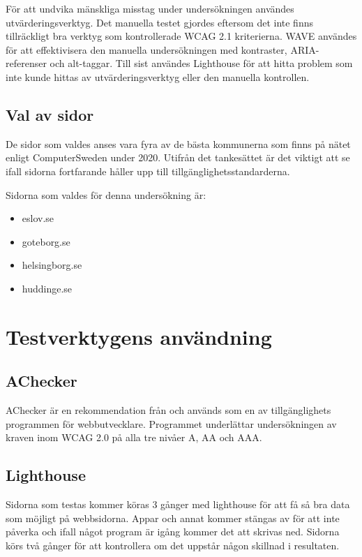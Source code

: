 \documentclass[11p]{article}
\begin{document}
    För att undvika mänskliga misstag under undersökningen användes utvärderingsverktyg.
    Det manuella testet gjordes eftersom det inte finns tillräckligt bra verktyg som kontrollerade WCAG 2.1 kriterierna.
    WAVE användes för att effektivisera den manuella undersökningen med kontraster, ARIA-referenser och alt-taggar.
    Till sist användes Lighthouse för att hitta problem som inte kunde hittas av utvärderingsverktyg eller den manuella kontrollen.

    \subsection{Val av sidor}
    De sidor som valdes anses vara fyra av de bästa kommunerna som finns på nätet enligt ComputerSweden under 2020.
    Utifrån det tankesättet är det viktigt att se ifall sidorna fortfarande håller upp till tillgänglighetsstandarderna.

    Sidorna som valdes för denna undersökning är:

    \begin{itemize}
        \item eslov.se
        \item goteborg.se
        \item helsingborg.se
        \item huddinge.se
    \end{itemize}

    \section{Testverktygens användning}

    \subsection{AChecker}
    AChecker är en rekommendation från \textcite{AChecker} och används som en av tillgänglighets programmen för webbutvecklare.
    Programmet underlättar undersökningen av kraven inom WCAG 2.0 på alla tre nivåer A, AA och AAA.

    \subsection{Lighthouse}
    Sidorna som testas kommer köras 3 gånger med lighthouse för att få så bra data som möjligt på webbsidorna.
    Appar och annat kommer stängas av för att inte påverka och ifall något program är igång kommer det att skrivas ned.
    Sidorna körs två gånger för att kontrollera om det uppstår någon skillnad i resultaten.
\end{document}
